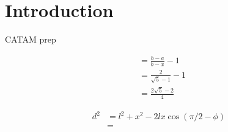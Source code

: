 \documentclass[a4paper]{article}
\begin{document}
\maketitle

\setcounter{section}{-1}
\section{Introduction}

CATAM prep



\begin{align*}
& = \frac{b-a}{b-x} - 1 \\
& = \frac{2}{\sqrt{5}-1} - 1\\
& = \frac{2\sqrt{5} - 2}{4}
\end{align*}

\begin{align*}
d^{2} & = l^{2} + x^{2} - 2 l x \cos(\pi/2 - \phi)  \\
& = 
\end{align*}
\end{document}
